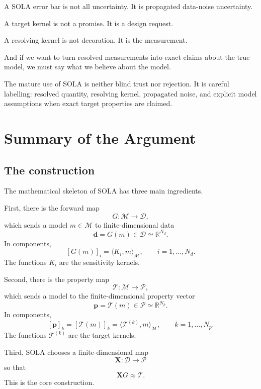\documentclass[11pt,openany]{book}
\theoremstyle{definition}
\theoremstyle{remark}
\newcommand{\M}{\mathcal M}
\newcommand{\D}{\mathcal D}
\newcommand{\Pspace}{\mathcal P}
\newcommand{\Tau}{\mathcal{T}}
\begin{document}
A SOLA error bar is not all uncertainty. It is propagated data-noise uncertainty.

A target kernel is not a promise. It is a design request.

A resolving kernel is not decoration. It is the measurement.

And if we want to turn resolved measurements into exact claims about the true model, we must
say what we believe about the model.

\begin{checkpointbox}
The mature use of SOLA is neither blind trust nor rejection. It is careful labelling:
resolved quantity, resolving kernel, propagated noise, and explicit model assumptions when
exact target properties are claimed.
\end{checkpointbox}


\backmatter


\chapter{Summary of the Argument}

\section{The construction}

The mathematical skeleton of SOLA has three main ingredients.

First, there is the forward map
\[
  G:\M\to\D,
\]
which sends a model \(m\in\M\) to finite-dimensional data
\[
  \mathbf d=G(m)\in\D\simeq\mathbb R^{N_d}.
\]
In components,
\[
  [G(m)]_i
  =
  \langle K_i,m\rangle_{\M},
  \qquad i=1,\dots,N_d.
\]
The functions \(K_i\) are the sensitivity kernels.

Second, there is the property map
\[
  \Tau:\M\to\Pspace,
\]
which sends a model to the finite-dimensional property vector
\[
  \mathbf p=\Tau(m)\in\Pspace\simeq\mathbb R^{N_p}.
\]
In components,
\[
  [\mathbf p]_k
  =
  [\Tau(m)]_k
  =
  \langle \mathcal T^{(k)},m\rangle_{\M},
  \qquad k=1,\dots,N_p.
\]
The functions \(\mathcal T^{(k)}\) are the target kernels.

Third, SOLA chooses a finite-dimensional map
\[
  \mathbf X:\D\to\Pspace
\]
so that
\[
  \mathbf XG\approx \Tau.
\]
This is the core construction.
\end{document}
